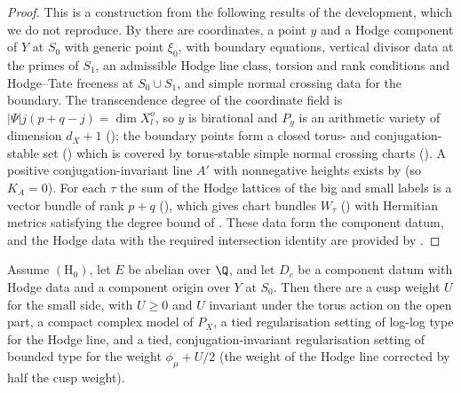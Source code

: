 \begin{proof}
This is a construction from the following results of the development, which we do not reproduce. By
 there are coordinates, a point $y$ and a Hodge component of $Y$ at
$S_0$ with generic point $\xi_0$, with boundary equations, vertical divisor data at the primes of $S_1$, an
admissible Hodge line class, torsion and rank conditions and Hodge--Tate freeness at $S_0\cup S_1$, and simple normal
crossing data for the boundary. The transcendence degree of the coordinate field is
$|\Psi|j(p+q-j)=\dim X^o_l$, so $y$ is birational and $P_y$ is an arithmetic variety of dimension $d_X+1$
(); the boundary points form a closed torus- and
conjugation-stable set () which is covered by torus-stable simple
normal crossing charts (). A positive conjugation-invariant
line $A'$ with nonnegative heights exists by  (so $K_A=0$).
For each $\tau$ the sum of the Hodge lattices of the big and small labels is a vector bundle of rank $p+q$
(), which gives chart bundles $W_\tau$
() with Hermitian metrics satisfying the degree bound of
. These data form the component datum, and the Hodge data with
the required intersection identity are provided by .
\end{proof}

\begin{proposition}\label{pf:volthm:prop:cuspweight}
Assume $(\mathrm{H}_0)$, let $E$ be abelian over $\Q$, and let $D_c$ be a component datum with Hodge data and a
component origin over $Y$ at $S_0$. Then there are a cusp weight $U$ for the small side, with $U\ge0$ and $U$ invariant
under the torus action on the open part, a compact complex model of $P_X$, a tied regularisation setting of log-log type
for the Hodge line, and a tied, conjugation-invariant regularisation setting of bounded type for the weight
$\phi_\mu+U/2$ (the weight of the Hodge line corrected by half the cusp weight).
\end{proposition}

